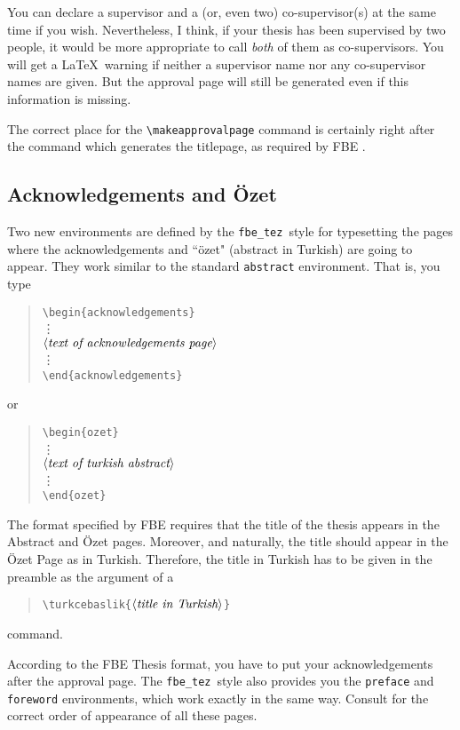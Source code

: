 \documentclass[12pt]{article}
\newcommand\fbe{{\tt fbe\_tez}}
\newcommand{\bq}{\begin{quotation}\noindent}
\newcommand{\eq}{\end{quotation}}
\renewcommand{\arg}[1]{$\langle\mbox{\it #1}\rangle$}
\begin{document}
You can declare a supervisor and a (or, even two) co-supervisor(s) at
the same time if you wish. Nevertheless, I think, if your thesis has
been supervised by two people, it would be more appropriate to call
{\em both\/} of them as co-supervisors. You will get a \LaTeX\ warning
if neither a supervisor name nor any co-supervisor names are given.
But the approval page will still be generated even if this information
is missing.

The correct place for the \verb/\makeapprovalpage/ command is
certainly right after the command which generates the titlepage, as
required by FBE \cite{fbeman}.

\subsection{Acknowledgements and \"Ozet}
Two new environments are defined by the \fbe\ style for typesetting
the pages where the acknowledgements and ``\"ozet" (abstract in
Turkish) are going to appear. They work similar to the standard
{\tt abstract} environment. That is, you type
\bq
\verb/\begin{acknowledgements}/ \\
\verb//\vdots \\
\verb//$\langle\mbox{\it text of acknowledgements page}\rangle$\\
\verb//\vdots \\
\verb/\end{acknowledgements}/
\eq
or
\bq
\verb/\begin{ozet}/ \\
\verb//\vdots \\
\verb//$\langle\mbox{\it text of turkish abstract}\rangle$\\
\verb//\vdots \\
\verb/\end{ozet}/
\eq

The format specified by FBE \cite{fbeman} requires that the title
of the thesis appears in the Abstract and \"Ozet pages. Moreover,
and naturally, the title should appear in the \"Ozet Page as in
Turkish. Therefore, the title in Turkish has to be given in the
preamble as the argument of a
\bq
\verb/\turkcebaslik{/\arg{title in Turkish}\verb/}/
\eq
command.

According to the FBE Thesis format, you have to put your
acknowledgements after the approval page. The \fbe\ style also
provides you the {\tt preface} and {\tt foreword} environments, which
work exactly in the same way. Consult \cite{fbeman} for the correct
order of appearance of all these pages.
\end{document}
